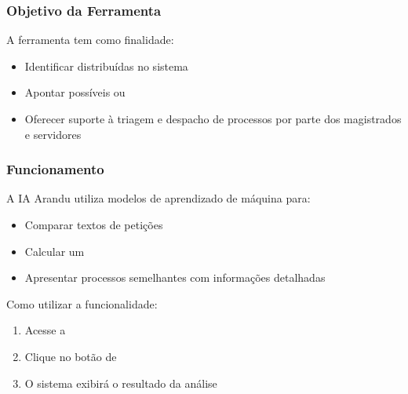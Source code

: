 \documentclass[letterpaper,10pt,brazil]{sphinxmanual}
\begin{document}
\subsubsection{Objetivo da Ferramenta}
\label{\detokenize{projud_14_iaarandu:objetivo-da-ferramenta}}
\sphinxAtStartPar
A ferramenta tem como finalidade:
\begin{itemize}
\item {} 
\sphinxAtStartPar
Identificar  distribuídas no sistema

\item {} 
\sphinxAtStartPar
Apontar possíveis  ou 

\item {} 
\sphinxAtStartPar
Oferecer suporte à triagem e despacho de processos por parte dos magistrados e servidores

\end{itemize}


\subsubsection{Funcionamento}
\label{\detokenize{projud_14_iaarandu:funcionamento}}
\sphinxAtStartPar
A IA Arandu utiliza modelos de aprendizado de máquina para:
\begin{itemize}
\item {} 
\sphinxAtStartPar
Comparar textos de petições

\item {} 
\sphinxAtStartPar
Calcular um 

\item {} 
\sphinxAtStartPar
Apresentar processos semelhantes com informações detalhadas

\end{itemize}

\sphinxAtStartPar
Como utilizar a funcionalidade:
\begin{enumerate}
%
\item {} 
\sphinxAtStartPar
Acesse a 

\item {} 
\sphinxAtStartPar
Clique no botão de 

\item {} 
\sphinxAtStartPar
O sistema exibirá o resultado da análise

\end{enumerate}
\end{document}
